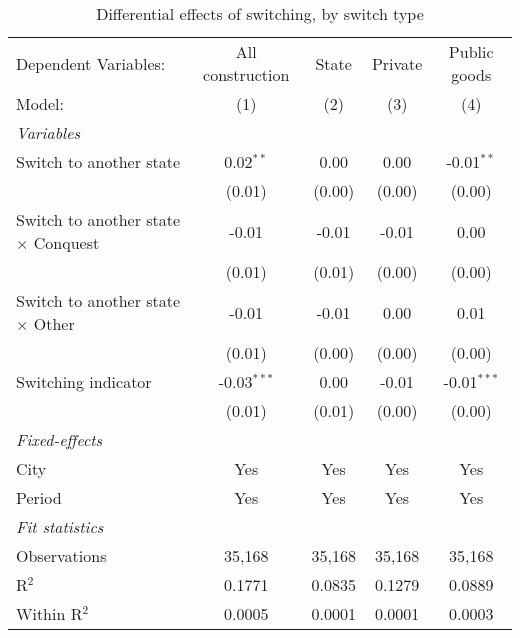 \begin{table}[htbp]
   \caption{\label{tab:baseline_10y} Differential effects of switching, by switch type}
   \centering
   \begin{tabular}{lcccc}
      \tabularnewline \midrule \midrule
      Dependent Variables:                       & All construction & State  & Private & Public goods\\  
      Model:                                     & (1)              & (2)    & (3)     & (4)\\  
      \midrule
      \emph{Variables}\\
      Switch to another state                    & 0.02$^{**}$      & 0.00   & 0.00    & -0.01$^{**}$\\   
                                                 & (0.01)           & (0.00) & (0.00)  & (0.00)\\   
      Switch to another state $\times$ Conquest  & -0.01            & -0.01  & -0.01   & 0.00\\   
                                                 & (0.01)           & (0.01) & (0.00)  & (0.00)\\   
      Switch to another state $\times$ Other     & -0.01            & -0.01  & 0.00    & 0.01\\   
                                                 & (0.01)           & (0.00) & (0.00)  & (0.00)\\   
      Switching indicator                        & -0.03$^{***}$    & 0.00   & -0.01   & -0.01$^{***}$\\   
                                                 & (0.01)           & (0.01) & (0.00)  & (0.00)\\   
      \midrule
      \emph{Fixed-effects}\\
      City                                       & Yes              & Yes    & Yes     & Yes\\  
      Period                                     & Yes              & Yes    & Yes     & Yes\\  
      \midrule
      \emph{Fit statistics}\\
      Observations                               & 35,168           & 35,168 & 35,168  & 35,168\\  
      R$^2$                                      & 0.1771           & 0.0835 & 0.1279  & 0.0889\\  
      Within R$^2$                               & 0.0005           & 0.0001 & 0.0001  & 0.0003\\  
      \midrule \midrule
      

\end{tabular}
\end{table}
